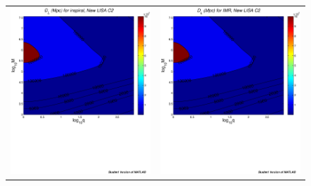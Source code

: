 \documentclass{iopart}
\begin{document}
\begin{figure}[H]
\begin{center}
\begin{tabular}{cc}
\includegraphics[scale=0.41,clip=true]{FigEmanuele/C2InspDLContour.ps}
&\includegraphics[scale=0.41,clip=true]{FigEmanuele/C2IMRDLContour.ps}\\

\end{tabular}
\end{center}
\end{figure}
\end{document}
